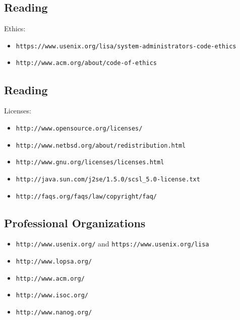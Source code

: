 \documentclass[xga]{xdvislides}
\begin{document}
\subsection{Reading}
Ethics:
\begin{itemize}
	\item \verb+https://www.usenix.org/lisa/system-administrators-code-ethics+
	\item \verb+http://www.acm.org/about/code-of-ethics+
\end{itemize}


\subsection{Reading}
Licenses:
\begin{itemize}
	\item \verb+http://www.opensource.org/licenses/+
	\item \verb+http://www.netbsd.org/about/redistribution.html+
	\item \verb+http://www.gnu.org/licenses/licenses.html+
	\item \verb+http://java.sun.com/j2se/1.5.0/scsl_5.0-license.txt+
	\item \verb+http://faqs.org/faqs/law/copyright/faq/+
\end{itemize}

\subsection{Professional Organizations}
\begin{itemize}
	\item \verb+http://www.usenix.org/+ and \verb+https://www.usenix.org/lisa+
	\item \verb+http://www.lopsa.org/+
	\item \verb+http://www.acm.org/+
	\item \verb+http://www.isoc.org/+
	\item \verb+http://www.nanog.org/+
\end{itemize}
\end{document}
